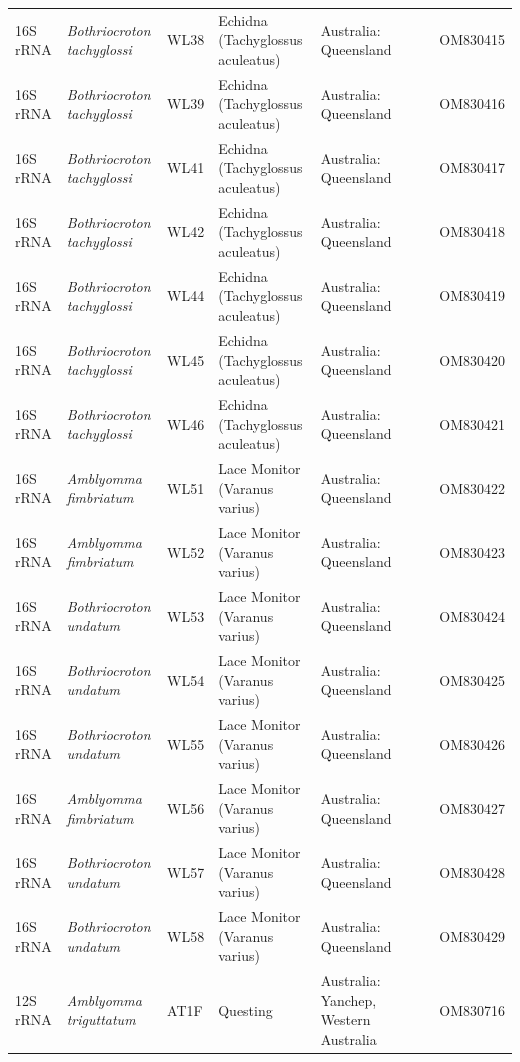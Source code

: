 \documentclass[a4paper, nobind]{templates/ociamthesis}
\begin{document}
\begin{landscape}
\begin{longtable}[t]{l>{}lllllll}
16S rRNA & \em{Bothriocroton tachyglossi} & WL38 & Echidna (Tachyglossus aculeatus) & Australia: Queensland &  &  & OM830415\\
16S rRNA & \em{Bothriocroton tachyglossi} & WL39 & Echidna (Tachyglossus aculeatus) & Australia: Queensland &  &  & OM830416\\
16S rRNA & \em{Bothriocroton tachyglossi} & WL41 & Echidna (Tachyglossus aculeatus) & Australia: Queensland &  &  & OM830417\\
16S rRNA & \em{Bothriocroton tachyglossi} & WL42 & Echidna (Tachyglossus aculeatus) & Australia: Queensland &  &  & OM830418\\
16S rRNA & \em{Bothriocroton tachyglossi} & WL44 & Echidna (Tachyglossus aculeatus) & Australia: Queensland &  &  & OM830419\\
16S rRNA & \em{Bothriocroton tachyglossi} & WL45 & Echidna (Tachyglossus aculeatus) & Australia: Queensland &  &  & OM830420\\
16S rRNA & \em{Bothriocroton tachyglossi} & WL46 & Echidna (Tachyglossus aculeatus) & Australia: Queensland &  &  & OM830421\\
16S rRNA & \em{Amblyomma fimbriatum} & WL51 & Lace Monitor (Varanus varius) & Australia: Queensland &  &  & OM830422\\
16S rRNA & \em{Amblyomma fimbriatum} & WL52 & Lace Monitor (Varanus varius) & Australia: Queensland &  &  & OM830423\\
16S rRNA & \em{Bothriocroton undatum} & WL53 & Lace Monitor (Varanus varius) & Australia: Queensland &  &  & OM830424\\
16S rRNA & \em{Bothriocroton undatum} & WL54 & Lace Monitor (Varanus varius) & Australia: Queensland &  &  & OM830425\\
16S rRNA & \em{Bothriocroton undatum} & WL55 & Lace Monitor (Varanus varius) & Australia: Queensland &  &  & OM830426\\
16S rRNA & \em{Amblyomma fimbriatum} & WL56 & Lace Monitor (Varanus varius) & Australia: Queensland &  &  & OM830427\\
16S rRNA & \em{Bothriocroton undatum} & WL57 & Lace Monitor (Varanus varius) & Australia: Queensland &  &  & OM830428\\
16S rRNA & \em{Bothriocroton undatum} & WL58 & Lace Monitor (Varanus varius) & Australia: Queensland &  &  & OM830429\\
12S rRNA & \em{Amblyomma triguttatum} & AT1F & Questing & Australia: Yanchep, Western Australia &  &  & OM830716\\

\end{longtable}
\end{landscape}
\end{document}

